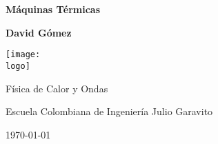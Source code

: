 \documentclass{article}
\newcommand{\logo}{"logo-eci-invert.png"}
\newcommand{\titlename}{Máquinas Térmicas}
\renewcommand{\author}{{David Gómez}}
\begin{document}
\begin{titlepage}
    \begin{center}
        \vspace{1cm}

        \textbf{\Huge{\titlename}}

        \vspace{1.5cm}

        \textbf{\large{\author}}

        \vspace{3cm}

        \texttt{[image: \\logo]}
        
        \vfill

        Física de Calor y Ondas

        Escuela Colombiana de Ingeniería Julio Garavito

        \today
    \end{center}
\end{titlepage}

\clearpage
\tableofcontents










\end{document}
